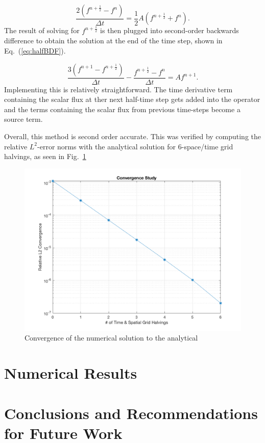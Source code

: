 \documentclass[12pt]{article}
\newcommand{\fn}[1]{\left( #1 \right)}
\newcommand{\be}{\begin{equation}}
\newcommand{\ee}{\end{equation}}
\newcommand{\LEQ}[1]{\label{eq:#1}}
\newcommand{\EQ}[1]{Eq.~(\ref{eq:#1})}
\newcommand{\LFI}[1]{\label{fi:#1}}
\newcommand{\FI}[1]{Fig.~\ref{fi:#1}}
\newcommand{\bfg}{\begin{figure}}
\newcommand{\efg}{\end{figure}}
\newcommand{\half}{\frac{1}{2}}
\begin{document}
\be
	\frac{2 \fn{ f^{n+\half} - f^n }}{\Delta t} =  \half A \fn{f^{n+\half} + f^n}.
\LEQ{halfCN} \ee
The result of solving for $f^{n+\half}$ is then plugged into second-order backwards difference to obtain the solution at the end of the time step, shown in \EQ{halfBDF}.

\be
	\frac{3 \fn{ f^{n+1} - f^{n+\half} }}{\Delta t} - \frac{f^{n+\half} - f^n}{\Delta t} = A f^{n+1}.
\LEQ{halfBDF} \ee 
Implementing this is relatively straightforward. The time derivative term containing the scalar flux at ther next half-time step gets added into the operator and the terms containing the scalar flux from previous time-steps become a source term.

Overall, this method is second order accurate. This was verified by computing the relative $L^2$-error norms with the analytical solution for 6-space/time grid halvings, as seen in \FI{2ord}

\bfg[h] \centering
	\includegraphics[scale=0.5]{method_convergence.png}
	\caption{Convergence of the numerical solution to the analytical}
	\LFI{2ord}
\efg



\section{Numerical Results}

\section{Conclusions and Recommendations for Future Work}


\end{document}
